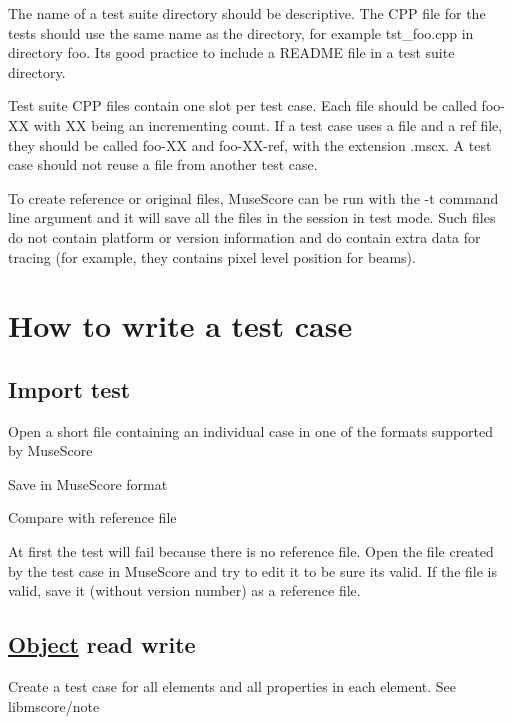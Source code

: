 The name of a test suite directory should be descriptive. The C\+PP file for the tests should use the same name as the directory, for example {\ttfamily tst\+\_\+foo.\+cpp} in directory {\ttfamily foo}. It\textquotesingle{}s good practice to include a R\+E\+A\+D\+ME file in a test suite directory.

Test suite C\+PP files contain one slot per test case. Each file should be called foo-\/\+XX with XX being an incrementing count. If a test case uses a file and a ref file, they should be called {\ttfamily foo-\/\+XX} and {\ttfamily foo-\/\+X\+X-\/ref}, with the extension .mscx. A test case should not reuse a file from another test case.

To create reference or original files, Muse\+Score can be run with the {\ttfamily -\/t} command line argument and it will save all the files in the session in test mode. Such files do not contain platform or version information and do contain extra data for tracing (for example, they contains pixel level position for beams).

\section*{How to write a test case }

\subsection*{Import test }


\begin{DoxyItemize}
\item Open a short file containing an individual case in one of the formats supported by Muse\+Score
\item Save in Muse\+Score format
\item Compare with reference file
\end{DoxyItemize}

At first the test will fail because there is no reference file. Open the file created by the test case in Muse\+Score and try to edit it to be sure it\textquotesingle{}s valid. If the file is valid, save it (without version number) as a reference file.

\subsection*{\hyperlink{class_object}{Object} read write }

Create a test case for all elements and all properties in each element. See {\ttfamily libmscore/note}


